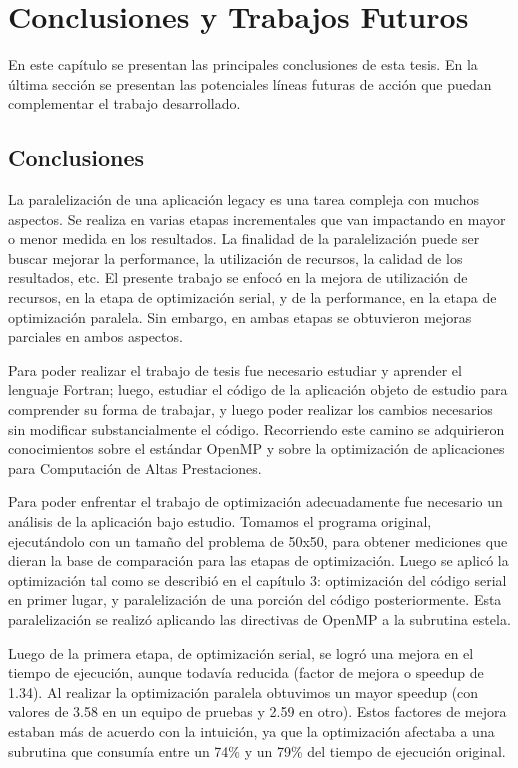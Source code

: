 \label{pagcap5}
\chapter{Conclusiones y Trabajos Futuros}

En este cap\'itulo se presentan las principales conclusiones de esta tesis. En la \'ultima secci\'on se presentan las potenciales l\'ineas futuras de acci\'on que puedan complementar el trabajo desarrollado.


\section{Conclusiones}
La paralelizaci\'on de una aplicaci\'on legacy es una tarea compleja con muchos aspectos. Se realiza en varias etapas incrementales que van impactando en mayor o menor medida en los resultados. La finalidad de la paralelizaci\'on puede ser buscar mejorar la performance, la utilizaci\'on de recursos, la calidad de los resultados, etc. El presente trabajo se enfoc\'o en la mejora de utilizaci\'on de recursos, en la etapa de optimizaci\'on serial, y de la performance, en la etapa de optimizaci\'on paralela. Sin embargo, en ambas etapas se obtuvieron mejoras parciales en ambos aspectos.

Para poder realizar el trabajo de tesis fue necesario estudiar y aprender el lenguaje Fortran; luego, estudiar el c\'odigo de la aplicaci\'on objeto de estudio para comprender su forma de trabajar, y luego poder realizar los cambios necesarios sin modificar substancialmente el c\'odigo. Recorriendo este camino se adquirieron conocimientos sobre el est\'andar OpenMP y sobre la optimizaci\'on de aplicaciones para Computaci\'on de Altas Prestaciones.

Para poder enfrentar el trabajo de optimizaci\'on adecuadamente fue necesario un an\'alisis de la aplicaci\'on bajo estudio. Tomamos el programa original, ejecut\'andolo con un tama\~no del problema de 50x50, para obtener mediciones que dieran la base de comparaci\'on para las etapas de optimizaci\'on. Luego se aplic\'o la optimizaci\'on tal como se describi\'o en el cap\'itulo 3: optimizaci\'on del c\'odigo serial en primer lugar, y paralelizaci\'on de una porci\'on del c\'odigo posteriormente. Esta paralelizaci\'on se realiz\'o aplicando las directivas de OpenMP a la subrutina estela.

Luego de la primera etapa, de optimizaci\'on serial, se logr\'o una mejora en el tiempo de ejecuci\'on, aunque todav\'ia reducida (factor de mejora o speedup de 1.34). Al realizar la optimizaci\'on paralela obtuvimos un mayor speedup (con valores de 3.58 en un equipo de pruebas y 2.59 en otro). Estos factores de mejora estaban m\'as de acuerdo con la intuici\'on, ya que la optimizaci\'on afectaba a una subrutina que consum\'ia entre un 74\% y un 79\% del tiempo de ejecuci\'on original.

